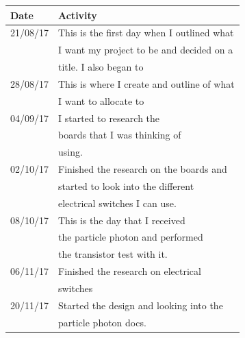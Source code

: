 \documentclass{article}
\begin{document}
\begin{tabularx}{\textwidth}{| X | X |}
    \hline
    \textbf{Date}            &               \textbf{Activity}           \\ \hline
    21/08/17                 &This is the first day when I outlined what \\
                             &I want my project to be and decided on a   \\
                             &title. I also began to \\ \hline
    28/08/17                 &This is where I create and outline of what \\
                             &I want to allocate to                      \\ \hline
    04/09/17                 &I started to research the                  \\
                             &boards that I was thinking of              \\
                             &using.                                     \\ \hline
    02/10/17                 &Finished the research on the boards and    \\
                             &started to look into the different          \\
                             &electrical switches I can use.             \\ \hline
    08/10/17                 &This is the day that I received            \\
                             &the particle photon and performed          \\
                             &the transistor test with it.               \\ \hline
    06/11/17                 &Finished the research on electrical        \\
                             &switches                                   \\ \hline
    20/11/17                 &Started the design and looking into the    \\
                             &particle photon docs.                      \\ \hline

\end{tabularx}
\end{document}
